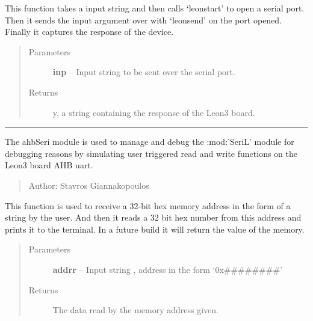 \documentclass[letterpaper,10pt,english]{sphinxmanual}
\begin{document}
\begin{fulllineitems}
\label{Code:SeriL.SeriLeon}
This function takes a input string and then calls `leonstart' to open a serial port. 
Then it sends the input argument over with `leonsend' on the port opened.
Finally it captures the response of the device.
\begin{quote}\begin{description}
\item[{Parameters}] \leavevmode
\textbf{inp} -- Input string to be sent over the serial port.

\item[{Returns}] \leavevmode
y, a string containing the response of the Leon3 board.

\end{description}\end{quote}

\end{fulllineitems}



\bigskip\hrule{}\bigskip

\label{Code:module-ahbSeri}
The ahbSeri module is used to manage and debug the :mod:'SeriL' module for debugging reasons
by simulating user triggered read and write functions on the Leon3 board AHB uart.
\begin{quote}

Author: Stavros Giannakopoulos
\end{quote}

\begin{fulllineitems}
\label{Code:ahbSeri.ahbread}
This function is used to receive a 32-bit hex memory address in the form of a string by the user. 
And then it reads a 32 bit hex number from this address and prints it to the terminal.
In a future build it will return the value of the memory.
\begin{quote}\begin{description}
\item[{Parameters}] \leavevmode
\textbf{addrr} -- Input string , address in the form `0x\#\#\#\#\#\#\#\#'

\item[{Returns}] \leavevmode
The data read by the memory address given.

\end{description}\end{quote}

\end{fulllineitems}
\end{document}
